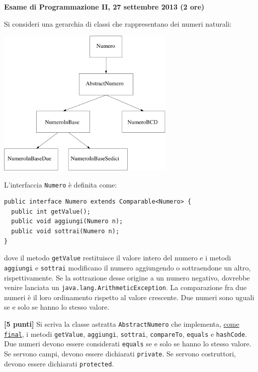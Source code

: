 \documentclass{article}[10pt]
\newcounter{esnu}
\newenvironment{esercizio}{\medskip \noindent {\bf Esercizio\addtocounter{esnu}{1} \arabic{esnu}}}{}
\begin{document}
\begin{center} {\bf Esame di Programmazione II, 27 settembre 2013 (2 ore)}\end{center}

Si consideri una gerarchia di classi che rappresentano dei numeri naturali:
%
\begin{center}
\includegraphics[width=8.5cm]{classi.pdf}
\end{center}

\noindent
L'interfaccia \texttt{Numero} \`e definita come:
%
{\small
\begin{verbatim}
public interface Numero extends Comparable<Numero> {
  public int getValue();
  public void aggiungi(Numero n);
  public void sottrai(Numero n);
}
\end{verbatim}
}

\noindent
dove il metodo \texttt{getValue} restituisce il valore intero del numero e i metodi
\texttt{aggiungi} e \texttt{sottrai} modificano il numero aggiungendo o sottraendone un altro,
rispettivamente. Se la sottrazione desse origine a un numero negativo, dovrebbe venire lanciata un
\texttt{java.lang.ArithmeticException}.
La comparazione fra due numeri \`e il loro ordinamento rispetto al valore crescente.
Due numeri sono uguali se e solo se hanno lo stesso valore.

\begin{esercizio}
\textbf{[5 punti]}
Si scriva la classe astratta \texttt{AbstractNumero} che implementa,
\underline{come \texttt{final}}, i metodi
\texttt{getValue}, \texttt{aggiungi}, \texttt{sottrai}, \texttt{compareTo},
\texttt{equals} e \texttt{hashCode}. Due numeri devono essere considerati
\texttt{equals} se e solo se hanno lo stesso valore.
Se servono campi, devono essere dichiarati \texttt{private}.
Se servono costruttori, devono essere dichiarati \texttt{protected}.
\end{esercizio}
\end{document}
